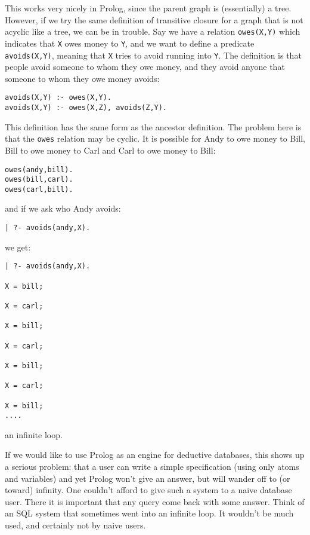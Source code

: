 This works very nicely in Prolog, since the parent graph is
(essentially) a tree.  However, if we try the same definition of
transitive closure for a graph that is not acyclic like a tree, we can
be in trouble.  Say we have a relation \verb|owes(X,Y)| which
indicates that \verb|X| owes money to \verb|Y|, and we want to define
a predicate
\verb|avoids(X,Y)|, meaning that \verb|X| tries to avoid running into
\verb|Y|.  The definition is that people avoid someone to whom they
owe money, and they avoid anyone that someone to whom they owe money
avoids:
\begin{verbatim}
avoids(X,Y) :- owes(X,Y).
avoids(X,Y) :- owes(X,Z), avoids(Z,Y).
\end{verbatim}
This definition has the same form as the ancestor definition.  The
problem here is that the \verb|owes| relation may be cyclic.  It is
possible for Andy to owe money to Bill, Bill to owe money to Carl and
Carl to owe money to Bill:
\begin{verbatim}
owes(andy,bill).
owes(bill,carl).
owes(carl,bill).
\end{verbatim}
and if we ask who Andy avoids:
\begin{verbatim}
| ?- avoids(andy,X).
\end{verbatim}
we get:
\begin{verbatim}
| ?- avoids(andy,X).

X = bill;

X = carl;

X = bill;

X = carl;

X = bill;

X = carl;

X = bill;
....
\end{verbatim}
an infinite loop.

If we would like to use Prolog as an engine for deductive databases,
this shows up a serious problem: that a user can write a simple
specification (using only atoms and variables) and yet Prolog won't
give an answer, but will wander off to (or toward) infinity.  One
couldn't afford to give such a system to a naive database user.  There
it is important that any query come back with some answer.  Think of
an SQL system that sometimes went into an infinite loop.  It wouldn't
be much used, and certainly not by naive users.

